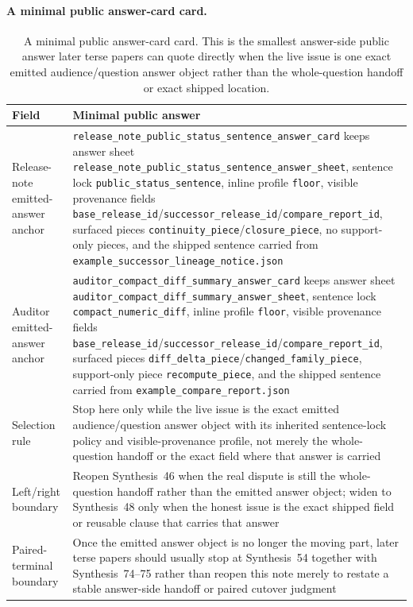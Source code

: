 \documentclass[11pt]{article}
\begin{document}
\paragraph{A minimal public answer-card card.}
\begin{table}[t]
\centering
\small
\begin{tabularx}{\linewidth}{@{}lX@{}}
\toprule
Field & Minimal public answer \\
\midrule
Release-note emitted-answer anchor & \nolinkurl{release_note_public_status_sentence_answer_card} keeps answer sheet \nolinkurl{release_note_public_status_sentence_answer_sheet}, sentence lock \nolinkurl{public_status_sentence}, inline profile \nolinkurl{floor}, visible provenance fields \nolinkurl{base_release_id}/\nolinkurl{successor_release_id}/\nolinkurl{compare_report_id}, surfaced pieces \nolinkurl{continuity_piece}/\nolinkurl{closure_piece}, no support-only pieces, and the shipped sentence carried from \nolinkurl{example_successor_lineage_notice.json} \\
Auditor emitted-answer anchor & \nolinkurl{auditor_compact_diff_summary_answer_card} keeps answer sheet \nolinkurl{auditor_compact_diff_summary_answer_sheet}, sentence lock \nolinkurl{compact_numeric_diff}, inline profile \nolinkurl{floor}, visible provenance fields \nolinkurl{base_release_id}/\nolinkurl{successor_release_id}/\nolinkurl{compare_report_id}, surfaced pieces \nolinkurl{diff_delta_piece}/\nolinkurl{changed_family_piece}, support-only piece \nolinkurl{recompute_piece}, and the shipped sentence carried from \nolinkurl{example_compare_report.json} \\
Selection rule & Stop here only while the live issue is the exact emitted audience/question answer object with its inherited sentence-lock policy and visible-provenance profile, not merely the whole-question handoff or the exact field where that answer is carried \\
Left/right boundary & Reopen Synthesis~46 when the real dispute is still the whole-question handoff rather than the emitted answer object; widen to Synthesis~48 only when the honest issue is the exact shipped field or reusable clause that carries that answer \\
Paired-terminal boundary & Once the emitted answer object is no longer the moving part, later terse papers should usually stop at Synthesis~54 together with Synthesis~74--75 rather than reopen this note merely to restate a stable answer-side handoff or paired cutover judgment \\
\bottomrule
\end{tabularx}
\caption{A minimal public answer-card card. This is the smallest answer-side public answer later terse papers can quote directly when the live issue is one exact emitted audience/question answer object rather than the whole-question handoff or exact shipped location.}
\label{tab:minimal-public-answer-card-card}
\end{table}
\end{document}
